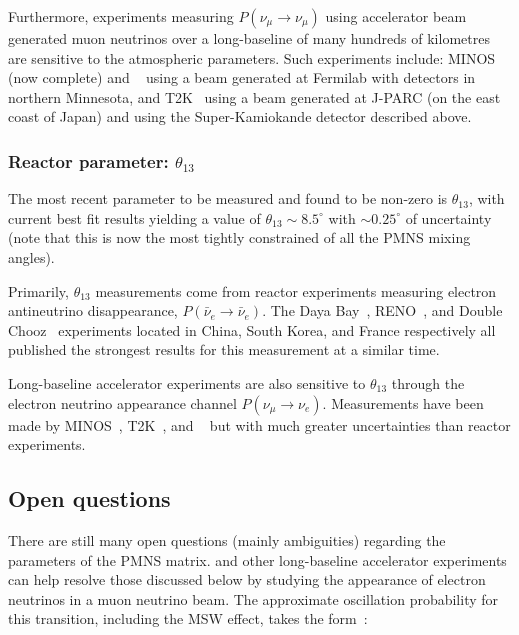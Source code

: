 Furthermore, experiments measuring $P(\nu_{\mu}\rightarrow\nu_{\mu})$ using accelerator beam
generated muon neutrinos over a long-baseline of many hundreds of kilometres are sensitive to the
atmospheric parameters. Such experiments include: MINOS~\cite{adamson2013_1, adamson2013_2} (now
complete) and \nova~\cite{acero2019, himmel2020} using a beam generated at Fermilab with detectors
in northern Minnesota, and T2K~\cite{dunne2020} using a beam generated at J-PARC (on the east
coast of Japan) and using the Super-Kamiokande detector described above.

\subsubsection*{Reactor parameter: $\theta_{13}$} %

The most recent parameter to be measured and found to be non-zero is $\theta_{13}$, with current
best fit results yielding a value of $\theta_{13}\sim8.5^{\circ}$ with $\sim0.25^{\circ}$ of
uncertainty (note that this is now the most tightly constrained of all the PMNS mixing angles).

Primarily, $\theta_{13}$ measurements come from reactor experiments measuring electron
antineutrino disappearance, $P(\bar{\nu}_{e}\rightarrow\bar{\nu}_{e})$. The Daya Bay~\cite{an2012,
an2017}, RENO~\cite{ahn2012, bak2018}, and Double Chooz~\cite{abe2012} experiments located in
China, South Korea, and France respectively all published the strongest results for this
measurement at a similar time.

Long-baseline accelerator experiments are also sensitive to $\theta_{13}$ through the electron
neutrino appearance channel $P(\nu_{\mu}\rightarrow\nu_{e})$. Measurements have been made by
MINOS~\cite{adamson2013_2}, T2K~\cite{abe2013}, and \nova~\cite{adamson2016_2} but with much
greater uncertainties than reactor experiments.

\subsection{Open questions} %
\label{sec:theory_status_open} %

There are still many open questions (mainly ambiguities) regarding the parameters of the PMNS
matrix. \chips and other long-baseline accelerator experiments can help resolve those discussed
below by studying the appearance of electron neutrinos in a muon neutrino beam. The approximate
oscillation probability for this transition, including the MSW effect, takes the
form~\cite{particle2020}:

